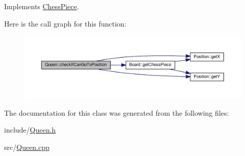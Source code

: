 Implements \hyperlink{classChessPiece_a90119a7c3c74ed9f967c398b8a7d7a98}{Chess\+Piece}.

Here is the call graph for this function\+:
\nopagebreak
\begin{figure}[H]
\begin{center}
\leavevmode
\includegraphics[width=350pt]{classQueen_a504eb0f657c4ae6acbf54ef8ab4c5cf9_cgraph}
\end{center}
\end{figure}


The documentation for this class was generated from the following files\+:\begin{DoxyCompactItemize}
\item 
include/\hyperlink{Queen_8h}{Queen.\+h}\item 
src/\hyperlink{Queen_8cpp}{Queen.\+cpp}\end{DoxyCompactItemize}
